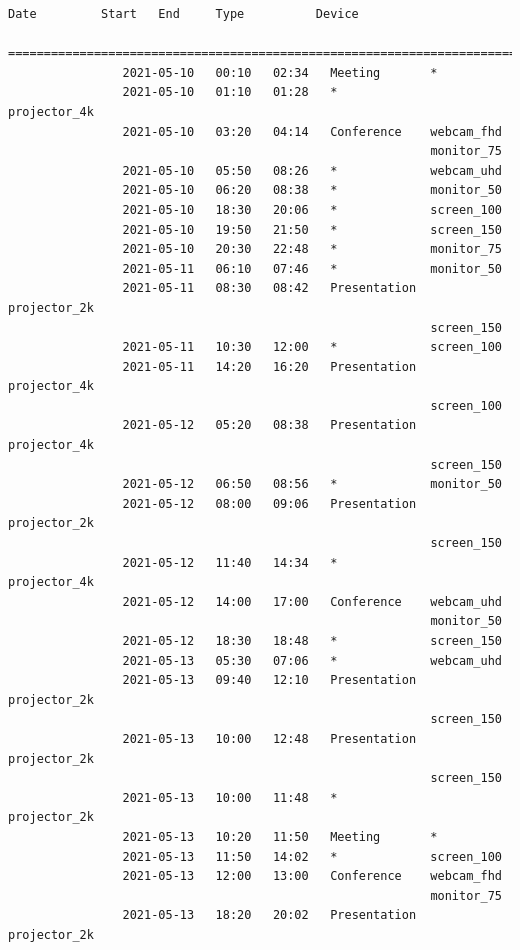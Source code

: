 \documentclass{article}
\begin{document}
\begin{Verbatim}[gobble=8]
                Date         Start   End     Type          Device
                ===========================================================================
                2021-05-10   00:10   02:34   Meeting       *
                2021-05-10   01:10   01:28   *             projector_4k
                2021-05-10   03:20   04:14   Conference    webcam_fhd
                                                           monitor_75
                2021-05-10   05:50   08:26   *             webcam_uhd
                2021-05-10   06:20   08:38   *             monitor_50
                2021-05-10   18:30   20:06   *             screen_100
                2021-05-10   19:50   21:50   *             screen_150
                2021-05-10   20:30   22:48   *             monitor_75
                2021-05-11   06:10   07:46   *             monitor_50
                2021-05-11   08:30   08:42   Presentation  projector_2k
                                                           screen_150
                2021-05-11   10:30   12:00   *             screen_100
                2021-05-11   14:20   16:20   Presentation  projector_4k
                                                           screen_100
                2021-05-12   05:20   08:38   Presentation  projector_4k
                                                           screen_150
                2021-05-12   06:50   08:56   *             monitor_50
                2021-05-12   08:00   09:06   Presentation  projector_2k
                                                           screen_150
                2021-05-12   11:40   14:34   *             projector_4k
                2021-05-12   14:00   17:00   Conference    webcam_uhd
                                                           monitor_50
                2021-05-12   18:30   18:48   *             screen_150
                2021-05-13   05:30   07:06   *             webcam_uhd
                2021-05-13   09:40   12:10   Presentation  projector_2k
                                                           screen_150
                2021-05-13   10:00   12:48   Presentation  projector_2k
                                                           screen_150
                2021-05-13   10:00   11:48   *             projector_2k
                2021-05-13   10:20   11:50   Meeting       *
                2021-05-13   11:50   14:02   *             screen_100
                2021-05-13   12:00   13:00   Conference    webcam_fhd
                                                           monitor_75
                2021-05-13   18:20   20:02   Presentation  projector_2k

\end{Verbatim}
\end{document}
